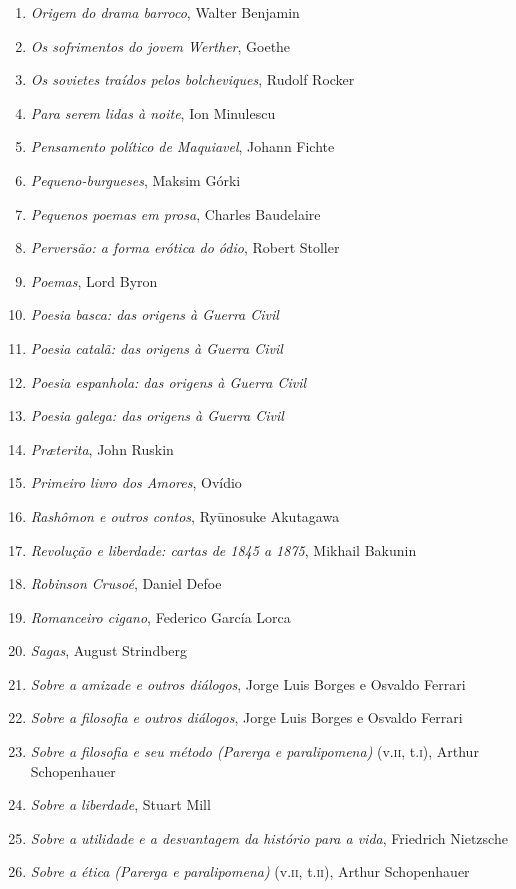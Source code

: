 \begin{enumerate}
\item \textit{Origem do drama barroco}, Walter Benjamin
\item \textit{Os sofrimentos do jovem Werther}, Goethe
\item \textit{Os sovietes traídos pelos bolcheviques}, Rudolf Rocker
\item \textit{Para serem lidas à noite}, Ion Minulescu
\item \textit{Pensamento político de Maquiavel}, Johann Fichte
\item \textit{Pequeno-burgueses}, Maksim Górki
\item \textit{Pequenos poemas em prosa}, Charles Baudelaire
\item \textit{Perversão: a forma erótica do ódio}, Robert Stoller
\item \textit{Poemas}, Lord Byron
\item \textit{Poesia basca: das origens à Guerra Civil} 
\item \textit{Poesia catalã: das origens à Guerra Civil} 
\item \textit{Poesia espanhola: das origens à Guerra Civil} 
\item \textit{Poesia galega: das origens à Guerra Civil} 
\item \textit{Pr\ae terita}, John Ruskin
\item \textit{Primeiro livro dos Amores}, Ovídio
\item \textit{Rashômon e outros contos}, Ryūnosuke Akutagawa
\item \textit{Revolução e liberdade: cartas de 1845 a 1875}, Mikhail Bakunin
\item \textit{Robinson Crusoé}, Daniel Defoe
\item \textit{Romanceiro cigano}, Federico García Lorca
\item \textit{Sagas}, August Strindberg
\item \textit{Sobre a amizade e outros diálogos}, Jorge Luis Borges e Osvaldo Ferrari
\item \textit{Sobre a filosofia e outros diálogos}, Jorge Luis Borges e Osvaldo Ferrari
\item \textit{Sobre a filosofia e seu método (Parerga e paralipomena)} (v.\textsc{ii}, t.\textsc{i}), Arthur Schopenhauer 
\item \textit{Sobre a liberdade}, Stuart Mill
\item \textit{Sobre a utilidade e a desvantagem da histório para a vida}, Friedrich Nietzsche
\item \textit{Sobre a ética (Parerga e paralipomena)} (v.\textsc{ii}, t.\textsc{ii}), Arthur Schopenhauer 

\end{enumerate}
